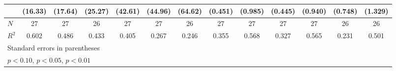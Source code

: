 {\begin{tabular}{l*{12}{c}}
            &     (16.33)         &     (17.64)         &     (25.27)         &     (42.61)         &     (44.96)         &     (64.62)         &     (0.451)         &     (0.985)         &     (0.445)         &     (0.940)         &     (0.748)         &     (1.329)         \\
\hline
\(N\)       &          27         &          27         &          26         &          27         &          27         &          26         &          27         &          27         &          27         &          27         &          26         &          26         \\
\(R^{2}\)   &       0.602         &       0.486         &       0.433         &       0.405         &       0.267         &       0.246         &       0.355         &       0.568         &       0.327         &       0.565         &       0.231         &       0.501         \\
\hline\hline
\multicolumn{13}{l}{\footnotesize Standard errors in parentheses}\\
\multicolumn{13}{l}{\footnotesize \sym{*} \(p<0.10\), \sym{**} \(p<0.05\), \sym{***} \(p<0.01\)}\\
\end{tabular}
}
